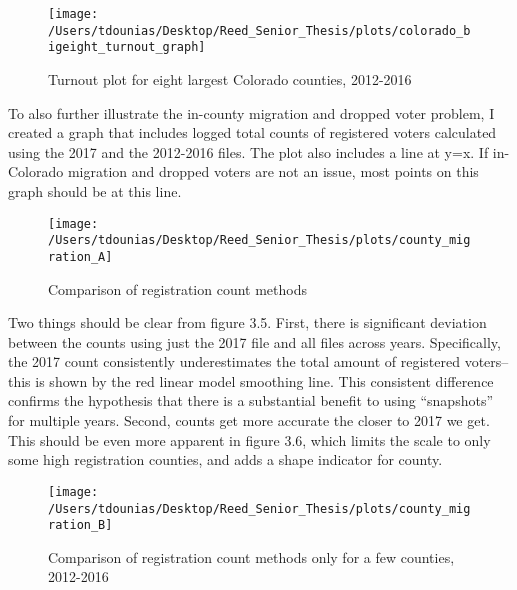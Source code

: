 \documentclass[12pt,twoside]{reedthesis}
\begin{document}
  \begin{figure}
  
  {\centering \texttt{[image: /Users/tdounias/Desktop/Reed\_Senior\_Thesis/plots/colorado\_bigeight\_turnout\_graph]} 
  
  }
  
  \caption[Turnout plot for eight largest Colorado counties, 2012-2016]{Turnout plot for eight largest Colorado counties, 2012-2016}\label{fig:big eight turnout plot}
  \end{figure}
  
  To also further illustrate the in-county migration and dropped voter
  problem, I created a graph that includes logged total counts of
  registered voters calculated using the 2017 and the 2012-2016 files. The
  plot also includes a line at y=x. If in-Colorado migration and dropped
  voters are not an issue, most points on this graph should be at this
  line.
  
  \begin{figure}
  
  {\centering \texttt{[image: /Users/tdounias/Desktop/Reed\_Senior\_Thesis/plots/county\_migration\_A]} 
  
  }
  
  \caption[Comparison of registration count methods]{Comparison of registration count methods}\label{fig:county migration A}
  \end{figure}
  
  Two things should be clear from figure 3.5. First, there is significant
  deviation between the counts using just the 2017 file and all files
  across years. Specifically, the 2017 count consistently underestimates
  the total amount of registered voters--this is shown by the red linear
  model smoothing line. This consistent difference confirms the hypothesis
  that there is a substantial benefit to using ``snapshots'' for multiple
  years. Second, counts get more accurate the closer to 2017 we get. This
  should be even more apparent in figure 3.6, which limits the scale to
  only some high registration counties, and adds a shape indicator for
  county.
  
  \begin{figure}
  
  {\centering \texttt{[image: /Users/tdounias/Desktop/Reed\_Senior\_Thesis/plots/county\_migration\_B]} 
  
  }
  
  \caption[Comparison of registration count methods only for a few counties, 2012-2016]{Comparison of registration count methods only for a few counties, 2012-2016}\label{fig:county migration B}
  \end{figure}
  
\end{document}
